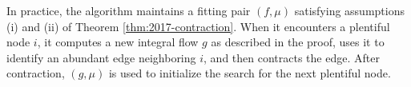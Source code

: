 \documentclass[11pt]{article}
\newtheorem{theorem}{Theorem}[section]
\theoremstyle{definition}
\theoremstyle{definition}
\theoremstyle{definition}
\renewcommand{\todo}[1]{\hl{TODO: #1}}
\begin{document}
	In practice, the algorithm maintains a fitting pair $(f, \mu)$ satisfying
	assumptions (i) and (ii) of Theorem \ref{thm:2017-contraction}. When it encounters
	a plentiful node $i$, it computes a new integral flow $g$ as described in the proof,
    uses it to identify
	an abundant edge neighboring $i$, and then contracts the edge.
	After contraction, $(g, \mu)$ is used to initialize the search for the next
	plentiful node.

%
\end{document}

